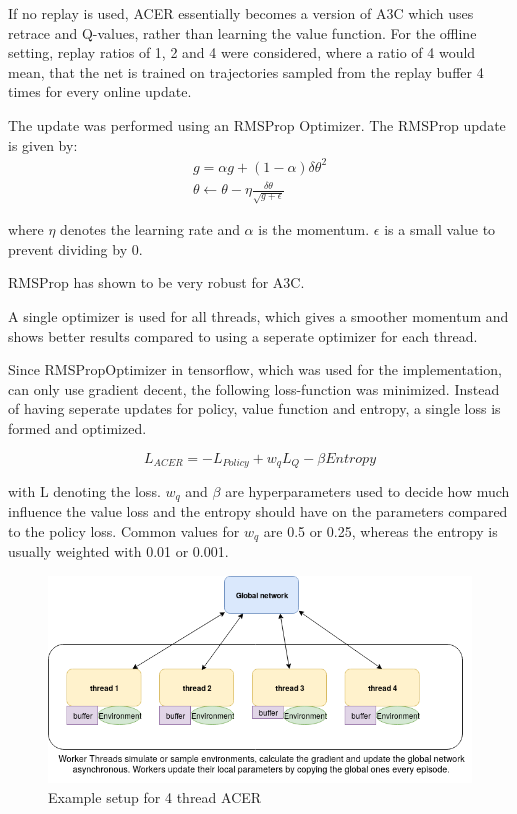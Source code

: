 If no replay is used, ACER essentially becomes a version of A3C which uses retrace and Q-values, rather than learning the value function. \citep{A3C} \linebreak
For the offline setting, replay ratios of 1, 2 and 4 were considered, where a ratio of 4 would mean, that the net is trained on trajectories sampled from the replay buffer 4 times for every online update.

The update was performed using an RMSProp Optimizer.
The RMSProp update is given by:
\begin{align}
g = \alpha g + (1- \alpha) \delta \theta^2 \\ \theta \gets \theta - \eta \frac{\delta \theta}{ \sqrt{g+\epsilon}}
\end{align}

where $\eta$ denotes the learning rate and $\alpha$ is the momentum. $\epsilon$ is a small value to prevent dividing by 0.

RMSProp has shown to be very robust for A3C. \citep{A3C}

A single optimizer is used for all threads, which gives a smoother momentum and shows better results compared to using a seperate optimizer for each thread.

Since RMSPropOptimizer in tensorflow, which was used for the implementation, can only use gradient decent, the following loss-function was minimized. Instead of having seperate updates for policy, value function and entropy, a single loss is formed and optimized.

\begin{equation}
L_{ACER} = - L_{Policy} + w_q L_{Q} - \beta Entropy
\end{equation}

with L denoting the loss. $w_q$ and $\beta$ are hyperparameters used to decide how much influence the value loss and the entropy should have on the parameters compared to the policy loss. Common values for $w_q$ are 0.5 or 0.25, whereas the entropy is usually weighted with 0.01 or 0.001.

\begin{figure}
\begin{center}

\includegraphics[scale=0.5]{bilder/ACERarchitecture.png}
\caption{Example setup for 4 thread ACER}
\end{center}

\end{figure}
\pagebreak
